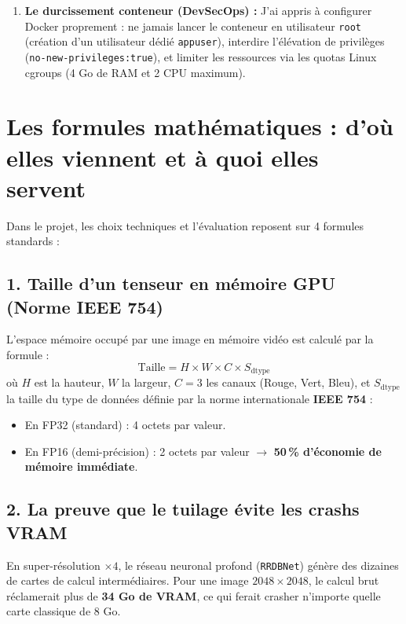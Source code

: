 \documentclass[11pt,a4paper]{article}
\begin{document}
\begin{enumerate}[leftmargin=*]
    \item \textbf{Le durcissement conteneur (DevSecOps) :}
    J'ai appris à configurer Docker proprement : ne jamais lancer le conteneur en utilisateur \texttt{root} (création d'un utilisateur dédié \texttt{appuser}), interdire l'élévation de privilèges (\texttt{no-new-privileges:true}), et limiter les ressources via les quotas Linux cgroups (4 Go de RAM et 2 CPU maximum).
\end{enumerate}

\section{Les formules mathématiques : d'où elles viennent et à quoi elles servent}

Dans le projet, les choix techniques et l'évaluation reposent sur 4 formules standards :

\subsection{1. Taille d'un tenseur en mémoire GPU (Norme IEEE 754)}
L'espace mémoire occupé par une image en mémoire vidéo est calculé par la formule :
\begin{equation}
    \text{Taille} = H \times W \times C \times S_{\text{dtype}}
\end{equation}
où $H$ est la hauteur, $W$ la largeur, $C=3$ les canaux (Rouge, Vert, Bleu), et $S_{\text{dtype}}$ la taille du type de données définie par la norme internationale \textbf{IEEE 754} :
\begin{itemize}[noitemsep]
    \item En FP32 (standard) : 4 octets par valeur.
    \item En FP16 (demi-précision) : 2 octets par valeur $\rightarrow$ \textbf{50\,\% d'économie de mémoire immédiate}.
\end{itemize}

\subsection{2. La preuve que le tuilage évite les crashs VRAM}
En super-résolution $\times 4$, le réseau neuronal profond (\texttt{RRDBNet}) génère des dizaines de cartes de calcul intermédiaires. Pour une image $2048 \times 2048$, le calcul brut réclamerait plus de \textbf{34 Go de VRAM}, ce qui ferait crasher n'importe quelle carte classique de 8 Go.
\end{document}
